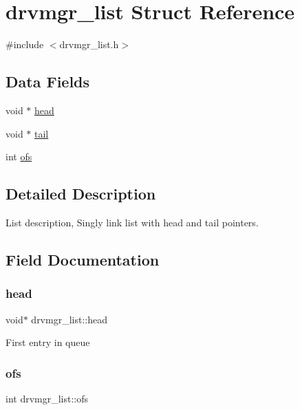 \hypertarget{structdrvmgr__list}{}\section{drvmgr\+\_\+list Struct Reference}
\label{structdrvmgr__list}


{\ttfamily \#include $<$drvmgr\+\_\+list.\+h$>$}

\subsection*{Data Fields}
\begin{DoxyCompactItemize}
\item 
void $\ast$ \mbox{\hyperlink{structdrvmgr__list_a0d958a59a315b89ebc01dc2e117dd153}{head}}
\item 
void $\ast$ \mbox{\hyperlink{structdrvmgr__list_ab5857a483cebdda62a1a574636926139}{tail}}
\item 
int \mbox{\hyperlink{structdrvmgr__list_a321db81a8984e82619ba5d90c9861798}{ofs}}
\end{DoxyCompactItemize}


\subsection{Detailed Description}
List description, Singly link list with head and tail pointers. 

\subsection{Field Documentation}
\mbox{\label{structdrvmgr__list_a0d958a59a315b89ebc01dc2e117dd153}} 
\subsubsection{\texorpdfstring{head}{head}}
{\footnotesize\ttfamily void$\ast$ drvmgr\+\_\+list\+::head}

First entry in queue \mbox{\label{structdrvmgr__list_a321db81a8984e82619ba5d90c9861798}} 
\subsubsection{\texorpdfstring{ofs}{ofs}}
{\footnotesize\ttfamily int drvmgr\+\_\+list\+::ofs}

